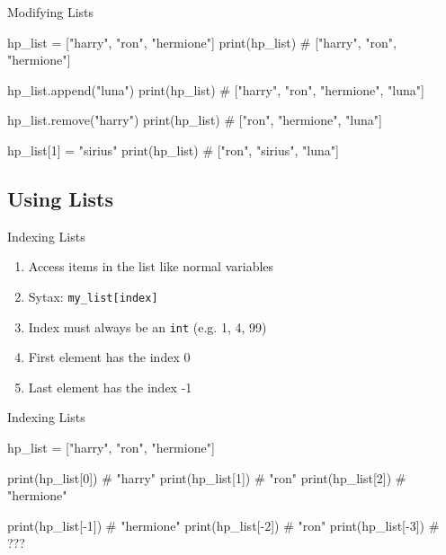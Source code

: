 \begin{frame}[fragile]{Modifying Lists}


    \begin{pythoncode}

hp_list = ["harry", "ron", "hermione"]
print(hp_list) # ["harry", "ron", "hermione"]

hp_list.append("luna")
print(hp_list) # ["harry", "ron", "hermione", "luna"]

hp_list.remove("harry")
print(hp_list) # ["ron", "hermione", "luna"]

hp_list[1] = "sirius"
print(hp_list) # ["ron", "sirius", "luna"]

    \end{pythoncode}


\end{frame}

\subsection{Using Lists}


\begin{frame}{Indexing Lists}

    \begin{enumerate}
		\item Access items in the list like normal variables
		\item Sytax: \texttt{my\_list[index]}
		\item Index must always be an \texttt{int} (e.g. 1, 4, 99)
		\item First element has the index 0
		\item Last element has the index -1
    \end{enumerate}


\end{frame}

\begin{frame}[fragile]{Indexing Lists}


    \begin{pythoncode}

hp_list = ["harry", "ron", "hermione"]
	
print(hp_list[0]) # "harry"
print(hp_list[1]) # "ron"
print(hp_list[2]) # "hermione"

print(hp_list[-1]) # "hermione"
print(hp_list[-2]) # "ron"
print(hp_list[-3]) # ???

    \end{pythoncode}



\end{frame}


